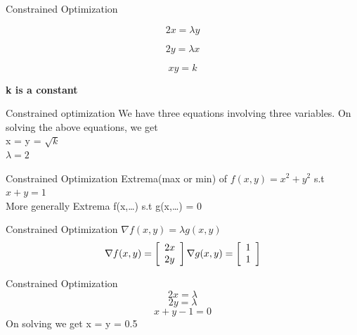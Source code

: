 \documentclass{beamer}
\begin{document}
\begin{frame}{Constrained Optimization}
    
    \begin{equation}
            2x = \lambda y
    \end{equation}
    
    
    \begin{equation}
            2y = \lambda x
    \end{equation}
    
    
    \begin{equation}
            xy = k
    \end{equation}
    
    \textbf{k is a constant}
\end{frame}

\begin{frame}{Constrained optimization}
    We have three equations involving three variables. 
    On solving the above equations, we get\\
    x = y = $\sqrt{k}$\\
    $\lambda = 2$\\
\end{frame}

\begin{frame}{Constrained Optimization}
    Extrema(max or min) of $f(x,y) = x^{2} + y^{2}$ s.t $x + y = 1$\\
    
    \vspace{5em}
    More generally Extrema f(x,\dots) s.t g(x,\dots) = 0
\end{frame}

\begin{frame}{Constrained Optimization}
    $\nabla f(x,y) = \lambda g(x,y)$ \\
    \vspace{1em}
    $$
   \nabla f(x, y)=\left[\begin{array}{l}
   	{2 x} \\
   	{2 y}
   \end{array}\right] 
    \vspace{1em} 
    \nabla g(x, y)=\left[\begin{array}{l}
    	{1} \\
    	{1}
    \end{array}\right]
    $$
\end{frame}

\begin{frame}{Constrained Optimization}
    \begin{equation}
        2x=\lambda
    \end{equation}
    \begin{equation}
        2y=\lambda
    \end{equation}
    \begin{equation}
        x + y - 1 = 0
    \end{equation}
    On solving we get x = y = 0.5
\end{frame}
\end{document}
